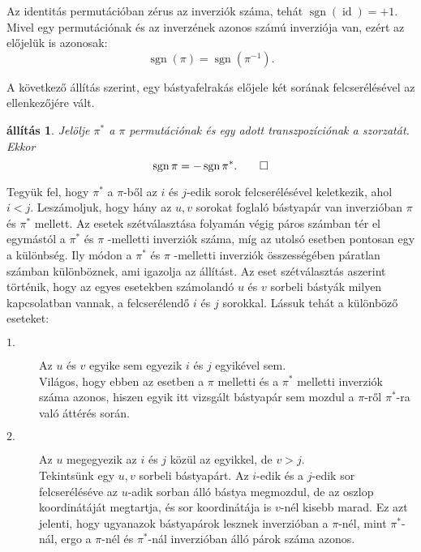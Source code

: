 \documentclass[a4paper, showtrims]{memoir}
\makeatletter
\renewenvironment{proof}[1][\proofname]
    {\par\pushQED{\qed}%
    \normalfont \topsep6\p@\@plus6\p@\relax
    \trivlist
    \item[\hskip\labelsep
        \itshape
    #1\@addpunct{:}]\ignorespaces}
    {\popQED\endtrivlist\@endpefalse}
\theoremstyle{plain}
\newtheorem{proposition}{állítás}[chapter]
\theoremstyle{remark}
\theoremstyle{definition}
\DeclareMathOperator{\sgn}{sgn}
\DeclareMathOperator{\id}{id}
\makeatother
\begin{document}
Az identitás permutációban zérus az inverziók száma,
tehát $\sgn(\id)=+1$.
Mivel egy permutációnak és az inverzének azonos számú inverziója van,
ezért az előjelük is azonosak:
\[
	\sgn\left( \pi \right)=\sgn\left( \pi^{-1} \right).
\]

A következő állítás szerint,
egy bástyafelrakás előjele két sorának felcserélésével az ellenkezőjére vált.
\begin{proposition}
	Jelölje $\pi^\ast$ a $\pi$ permutációnak és egy adott transzpozíciónak a szorzatát.
	Ekkor
	\[\sgn \pi=-\sgn\pi^\ast.\qedhere
	\]
\end{proposition}
\begin{proof}
	Tegyük fel,
	hogy $\pi^\ast$ a $\pi$-ből az $i$ és $j$-edik sorok felcserélésével keletkezik,
	ahol  $i<j$.
	Leszámoljuk,
	hogy hány az $u,v$ sorokat foglaló bástyapár van inverzióban $\pi$ és $\pi^\ast$ mellett.
	Az esetek szétválasztása folyamán végig páros számban tér el egymástól  a $\pi ^{\ast }$ és $\pi $ -melletti
	inverziók száma,
	míg az utolsó esetben pontosan egy a különbség.
	Ily módon a $\pi ^{\ast }$ és $\pi$ -melletti inverziók összességében páratlan számban különböznek,
	ami igazolja az állítást.
	Az eset szétválasztás aszerint történik, hogy az egyes esetekben számolandó $u$ és $v$ sorbeli bástyák
	milyen kapcsolatban vannak,
	a felcserélendő $i$ és $j$ sorokkal.
	Lássuk tehát a különböző eseteket:

	\begin{description}
		\item[$1.$]  Az $u$ és $v$ egyike sem egyezik $i$ és $j$ egyikével sem.\\
		      Világos, hogy ebben az esetben a $\pi $ melletti és a $\pi ^{\ast }$ melletti
		      inverziók száma azonos, hiszen egyik itt vizsgált bástyapár sem mozdul a $\pi$-ről $\pi^\ast$-ra
		      való áttérés során.

		\item[$2.$]  Az $u$ megegyezik az $i$ és $j$ közül az egyikkel, de $v>j.$\\
		      Tekintsünk egy $u,v$ sorbeli bástyapárt.
		      Az $i$-edik és a $j$-edik sor felcseréléséve az $u$-adik sorban álló bástya megmozdul,
		      de az oszlop koordinátáját megtartja, és sor koordinátája is $v$-nél kisebb marad.
		      Ez azt jelenti,
		      hogy ugyanazok bástyapárok lesznek inverzióban a $\pi$-nél, mint $\pi^\ast$-nál, ergo a
		      $\pi$-nél és $\pi^\ast$-nál inverzióban álló párok száma azonos.


\end{description}
\end{proof}
\end{document}
